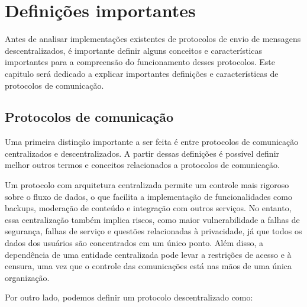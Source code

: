 
\chapter{Definições importantes}

Antes de analisar implementações existentes de protocolos de envio de mensagens descentralizados, é importante definir alguns conceitos e características importantes para a compreensão do funcionamento desses protocolos. Este capitulo será dedicado a explicar importantes definições e características de protocolos de comunicação.

\section{Protocolos de comunicação}

Uma primeira distinção importante a ser feita é entre protocolos de comunicação centralizados e descentralizados. A partir dessas definições é possível definir melhor outros termos e conceitos relacionados a protocolos de comunicação.


Um protocolo com arquitetura centralizada permite um controle mais rigoroso sobre o fluxo de dados, o que facilita a implementação de funcionalidades como backups, moderação de conteúdo e integração com outros serviços. No entanto, essa centralização também implica riscos, como maior vulnerabilidade a falhas de segurança, falhas de serviço e questões relacionadas à privacidade, já que todos os dados dos usuários são concentrados em um único ponto. Além disso, a dependência de uma entidade centralizada pode levar a restrições de acesso e à censura, uma vez que o controle das comunicações está nas mãos de uma única organização.

Por outro lado, podemos definir um protocolo descentralizado como:

